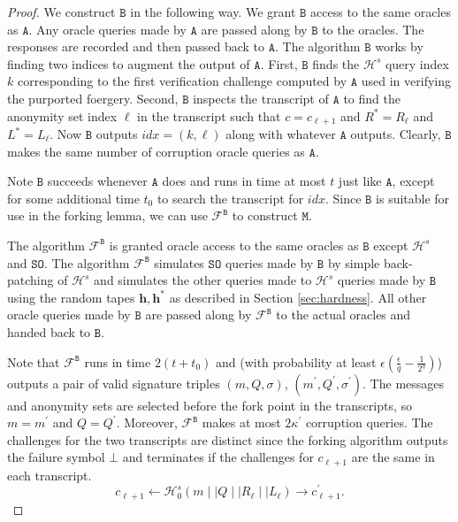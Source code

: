 \documentclass{llncs}
\begin{document}
\begin{proof}
We construct $\texttt{B}$ in the following way. We grant $\texttt{B}$ access to the same oracles as $\texttt{A}$. Any oracle queries made by $\texttt{A}$ are passed along by $\texttt{B}$ to the oracles. The responses are recorded and then passed back to $\texttt{A}$. The algorithm $\texttt{B}$ works by finding two indices to augment the output of $\texttt{A}$. First, $\texttt{B}$ finds the $\mathcal{H}^s$ query index $k$ corresponding to the first verification challenge computed by $\texttt{A}$ used in verifying the purported foergery. Second, $\texttt{B}$ inspects the transcript of $\texttt{A}$ to find the anonymity set index $\ell$ in the transcript such that $c = c_{\ell+1}$ and $R^* = R_\ell$ and $L^* = L_\ell$. Now $\texttt{B}$ outputs $idx = (k, \ell)$ along with whatever $\texttt{A}$ outputs. Clearly, $\texttt{B}$ makes the same number of corruption oracle queries as $\texttt{A}$.

Note $\texttt{B}$ succeeds whenever $\texttt{A}$ does and runs in time at most $t$ just like $\texttt{A}$, except for some additional time $t_0$ to search the transcript for $idx$.  Since $\texttt{B}$ is suitable for use in the forking lemma, we can use $\mathcal{F}^{\texttt{B}}$ to construct $\texttt{M}$.

The algorithm $\mathcal{F}^{\texttt{B}}$ is granted oracle access to the same oracles as $\texttt{B}$ except $\mathcal{H}^s$ and $\texttt{SO}$. The algorithm $\mathcal{F}^{\texttt{B}}$ simulates $\texttt{SO}$ queries made by $\texttt{B}$ by simple back-patching of $\mathcal{H}^s$ and simulates the other queries made to $\mathcal{H}^s$ queries made by $\texttt{B}$ using the random tapes $\textbf{h}, \textbf{h}^*$ as described in Section \ref{sec:hardness}. All other oracle queries made by $\texttt{B}$ are passed along by $\mathcal{F}^{\texttt{B}}$ to the actual oracles and handed back to $\texttt{B}$.

Note that $\mathcal{F}^{\texttt{B}}$ runs in time $2(t+t_0)$ and (with probability at least $\epsilon\left(\frac{\epsilon}{q} - \frac{1}{2^\eta}\right)$) outputs a pair of valid signature triples $(m, Q, \sigma)$, $(m^\prime, Q^\prime, \sigma^\prime)$. The messages and anonymity sets are selected before the fork point in the transcripts, so $m=m^\prime$ and $Q=Q^\prime$. Moreover, $\mathcal{F}^{\texttt{B}}$ makes at most $2\kappa^\prime$ corruption queries. The challenges for the two transcripts are distinct since the forking algorithm outputs the failure symbol $\bot$ and terminates if the challenges for $c_{\ell + 1}$ are the same in each transcript.
\[c_{\ell + 1} \leftarrow \mathcal{H}^s_0(m \mid \mid Q \mid \mid R_\ell \mid \mid L_\ell) \rightarrow c_{\ell+1}^\prime.\]


\end{proof}
\end{document}
